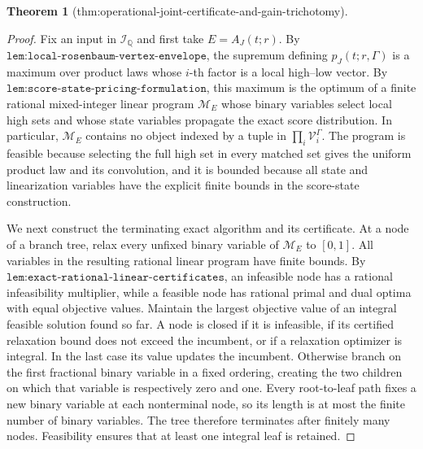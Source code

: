 \documentclass{article}
\newtheorem{theorem}{Theorem}
\begin{document}
\begin{theorem}[thm:operational-joint-certificate-and-gain-trichotomy]
\end{theorem}
\begin{proof}
Fix an input in \(\mathcal I_{\mathbb Q}\) and first take \(E=A_J(t;r)\). By \(\texttt{lem:local-rosenbaum-vertex-envelope}\), the supremum defining \(p_J(t;r,\Gamma)\) is a maximum over product laws whose \(i\)-th factor is a local high--low vector. By \(\texttt{lem:score-state-pricing-formulation}\), this maximum is the optimum of a finite rational mixed-integer linear program \(\mathcal M_E\) whose binary variables select local high sets and whose state variables propagate the exact score distribution. In particular, \(\mathcal M_E\) contains no object indexed by a tuple in \(\prod_i\mathcal V_i^\Gamma\). The program is feasible because selecting the full high set in every matched set gives the uniform product law and its convolution, and it is bounded because all state and linearization variables have the explicit finite bounds in the score-state construction.

We next construct the terminating exact algorithm and its certificate. At a node of a branch tree, relax every unfixed binary variable of \(\mathcal M_E\) to \([0,1]\). All variables in the resulting rational linear program have finite bounds. By \(\texttt{lem:exact-rational-linear-certificates}\), an infeasible node has a rational infeasibility multiplier, while a feasible node has rational primal and dual optima with equal objective values. Maintain the largest objective value of an integral feasible solution found so far. A node is closed if it is infeasible, if its certified relaxation bound does not exceed the incumbent, or if a relaxation optimizer is integral. In the last case its value updates the incumbent. Otherwise branch on the first fractional binary variable in a fixed ordering, creating the two children on which that variable is respectively zero and one. Every root-to-leaf path fixes a new binary variable at each nonterminal node, so its length is at most the finite number of binary variables. The tree therefore terminates after finitely many nodes. Feasibility ensures that at least one integral leaf is retained.


\end{proof}
\end{document}
